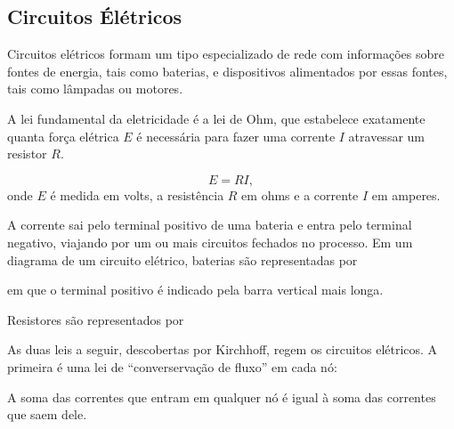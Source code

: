 \subsection{Circuitos Élétricos}

Circuitos elétricos formam um tipo especializado de rede com informações sobre fontes de energia, tais como baterias, e dispositivos alimentados por essas fontes, tais como lâmpadas ou motores.

A lei fundamental da eletricidade é a \textrm{lei de Ohm}, que estabelece exatamente quanta força elétrica $E$ é necessária para fazer uma corrente $I$ atravessar um resistor $R$.

\begin{definicao}
    \[
        E = RI,
    \] 
    onde $E$ é medida em \textrm{volts}, a resistência $R$ em \textrm{ohms} e a corrente $I$ em \textrm{amperes}.
\end{definicao}

A corrente sai pelo terminal positivo de uma bateria e entra pelo terminal negativo, viajando por um ou mais circuitos fechados no processo. Em um diagrama de um circuito elétrico, baterias são representadas por
\begin{center}
\end{center}
em que o terminal positivo é indicado pela barra vertical mais longa.

Resistores são representados por
\begin{center}
\end{center}

As duas leis a seguir, descobertas por Kirchhoff, regem os circuitos elétricos. A primeira é uma lei de ``converservação de fluxo'' em cada nó:

\begin{definicao}
    A soma das correntes que entram em qualquer nó é igual à soma das correntes que saem dele.
\end{definicao}

